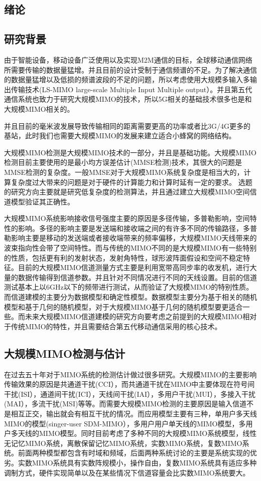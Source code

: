 \documentclass[bachelor,nocolorlinks, printoneside]{seuthesis} %
\begin{document}
\begin{Main} %

\chapter{绪论}
\section{研究背景}
由于智能设备，移动设备广泛使用以及实现M2M通信的目标，全球移动通信网络所需要传输的数据量猛增。并且目前的设计受制于通信频谱的不足。为了解决通信的数据量猛增以及低损的频谱波段的不足的问题，所以考虑使用大规模多输入多输出传输技术(LS-MIMO large-scale Multiple Input Multiple output）。并且第五代通信系统也致力于研究大规模MIMO的技术，所以5G相关的基础技术很多也是和大规模MIMO相关的。

并且目前的毫米波发展导致传输相同的距离需要更高的功率或者比3G/4G更多的基站，此时我们也需要大规模MIMO的发展来建立适合小蜂窝的网络结构。

大规模MIMO检测是大规模MIMO技术的一部分，并且是基础功能。大规模MIMO检测目前主要使用的是最小均方误差估计(MMSE检测)技术，其很大的问题是MMSE检测的复杂度。一般MMSE对于大规模MIMO系统复杂度是相当大的，计算复杂度过大带来的问题是对于硬件的计算能力和计算时延有一定的要求。
选题的研究方向主要就是研究低复杂度的检测算法，并且通过建立大规模MIMO空间信道模型验证其正确性。

大规模MIMO系统影响接收信号强度主要的原因是多径传输，多普勒影响，空间特性的影响。多径的影响主要是发送端和接收端之间的有许多不同的传输路径，多普勒影响主要是移动的发送端或者接收端带来的频率偏移，大规模MIMO天线带来的波束指向性会带了空间特性。而与传统的MIMO不同的是大规模MIMO有一些特别的性质，包括更有利的发射状态，发射角特性，球形波阵面假设和空间不稳定特征。目前的大规模MIMO信道测量方式主要是利用宽带高同步率的收发机，进行大量的数据传输得到信道参数。并且针对不同情况进行不同的天线设置。目前的信道测试基本上以6GHz以下的频带进行测试，从而验证了大规模MIMO的特别性质。而信道建模的主要分为数据模型和确定性模型。数据模型主要分为基于相关的随机模型和基于几何的随机模型，对于大规模MIMO基于几何的随机模型要更适合一些。而未来大规模MIMO信道建模的研究方向要考虑之前提到的大规模MIMO相对于传统MIMO的特性，并且需要结合第五代移动通信采用的核心技术。

\section{大规模MIMO检测与估计}
在过去五十年对于MIMO系统的检测估计做过很多研究。大规模MIMO的主要影响传输效果的原因是共通道干扰(CCI），而共通道干扰在MIMO中主要体现在符号间干扰(ISI），通道间干扰(ICI），天线间干扰(IAI），多用户干扰(MUI），多接入干扰(MAI），多流干扰(MSI)等等。而需要大规模MIMO检测的主要原因是输入信道不是相互正交，输出就会有相互干扰的情况。而应用模型主要有三种，单用户多天线MIMO的模型(singer-user SDM-MIMO），多用户用户单天线的MIMO模型，多用户多天线的MIMO模型。同时目前考虑了多种不同的大规模MIMO系统模型，线性无记忆MIMO系统，离散保留记忆MIMO系统，实数MIMO系统，复数MIMO系统。前面两种模型都包含有时域和频域，后面两种系统讨论的主要是系统实现的优劣。实数MIMO系统具有实数阵规模小，操作自由，复数MIMO系统具有适应多种调制方式，硬件实现简单以及在某些情况下信道容量会比实数MIMO系统要大。


\end{Main}
\end{document}
